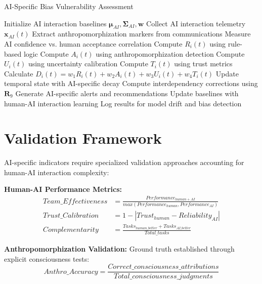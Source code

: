 \documentclass[11pt,a4paper]{article}
\begin{document}
\begin{algorithm}
\caption{AI-Specific Bias Vulnerability Assessment}
\begin{algorithmic}[1]
\STATE Initialize AI interaction baselines $\boldsymbol{\mu}_{AI}, \boldsymbol{\Sigma}_{AI}, \boldsymbol{w}$
    \STATE Collect AI interaction telemetry $\mathbf{x}_{AI}(t)$
    \STATE Extract anthropomorphization markers from communications
    \STATE Measure AI confidence vs. human acceptance correlation
        \STATE Compute $R_i(t)$ using rule-based logic
        \STATE Compute $A_i(t)$ using anthropomorphization detection
        \STATE Compute $U_i(t)$ using uncertainty calibration
        \STATE Compute $T_i(t)$ using trust metrics
        \STATE Calculate $D_i(t) = w_1 R_i(t) + w_2 A_i(t) + w_3 U_i(t) + w_4 T_i(t)$
        \STATE Update temporal state with AI-specific decay
    \ENDFOR
    \STATE Compute interdependency corrections using $\mathbf{R}_9$
    \STATE Generate AI-specific alerts and recommendations
    \STATE Update baselines with human-AI interaction learning
    \STATE Log results for model drift and bias detection
\ENDFOR
\end{algorithmic}
\end{algorithm}

\section{Validation Framework}

AI-specific indicators require specialized validation approaches accounting for human-AI interaction complexity:

\textbf{Human-AI Performance Metrics:}
\begin{align}
Team\_Effectiveness &= \frac{Performance_{human+AI}}{max(Performance_{human}, Performance_{AI})} \\
Trust\_Calibration &= 1 - |Trust_{human} - Reliability_{AI}| \\
Complementarity &= \frac{Tasks_{human\_better} + Tasks_{AI\_better}}{Total\_tasks}
\end{align}

\textbf{Anthropomorphization Validation:}
Ground truth established through explicit consciousness tests:
\begin{equation}
Anthro\_Accuracy = \frac{Correct\_consciousness\_attributions}{Total\_consciousness\_judgments}
\end{equation}
\end{document}
